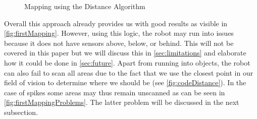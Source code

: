 \documentclass[twoside, 12pt]{article}
\begin{document}
\begin{figure}
\vspace{0pt}
  \begin{center}
  \end{center}
\vspace{-20pt}
  \caption{Mapping using the Distance Algorithm}
  \label{fig:firstMapping}
\vspace{20pt}
\end{figure}

\begin{figure}
\vspace{-50pt}
\end{figure}

Overall this approach already provides us with good results as visible in \autoref{fig:firstMapping}. However, using this logic, the robot may run into issues because it does not have sensors above, below, or behind. This will not be covered in this paper but we will discuss this in \autoref{sec:limitations} and elaborate how it could be done in \autoref{sec:future}. Apart from running into objects, the robot can also fail to scan all areas due to the fact that we use the closest point in our field of vision to determine where we should be (see \autoref{fig:codeDistance}). In the case of spikes some areas may thus remain unscanned as can be seen in \autoref{fig:firstMappingProblems}. The latter problem will be discussed in the next subsection.\\
\end{document}
